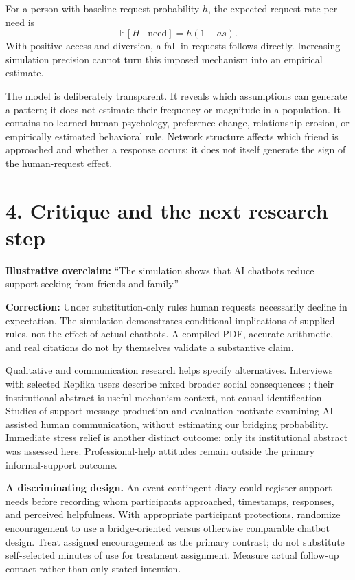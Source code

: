 \documentclass[11pt]{article}
\begin{document}
For a person with baseline request probability $h$, the expected request rate per need is
\[
 \mathbb{E}[H\mid\text{need}]=h(1-as).
\]
With positive access and diversion, a fall in requests follows directly. Increasing simulation precision cannot turn this imposed mechanism into an empirical estimate.

The model is deliberately transparent. It reveals which assumptions can generate a pattern; it does not estimate their frequency or magnitude in a population. It contains no learned human psychology, preference change, relationship erosion, or empirically estimated behavioral rule. Network structure affects which friend is approached and whether a response occurs; it does not itself generate the sign of the human-request effect.
\newpage
\section*{4. Critique and the next research step}
\textbf{Illustrative overclaim:} ``The simulation shows that AI chatbots reduce support-seeking from friends and family.''

\textbf{Correction:} Under substitution-only rules human requests necessarily decline in expectation. The simulation demonstrates conditional implications of supplied rules, not the effect of actual chatbots. A compiled PDF, accurate arithmetic, and real citations do not by themselves validate a substantive claim.

Qualitative and communication research helps specify alternatives. Interviews with selected Replika users describe mixed broader social consequences \citep{skjuve2021}; their institutional abstract is useful mechanism context, not causal identification. Studies of support-message production and evaluation \citep{meng2025,young2024} motivate examining AI-assisted human communication, without estimating our bridging probability. Immediate stress relief \citep{meng2021} is another distinct outcome; only its institutional abstract was assessed here. Professional-help attitudes \citep{ueda2026} remain outside the primary informal-support outcome.

\textbf{A discriminating design.} An event-contingent diary could register support needs before recording whom participants approached, timestamps, responses, and perceived helpfulness. With appropriate participant protections, randomize encouragement to use a bridge-oriented versus otherwise comparable chatbot design. Treat assigned encouragement as the primary contrast; do not substitute self-selected minutes of use for treatment assignment. Measure actual follow-up contact rather than only stated intention.
\end{document}
